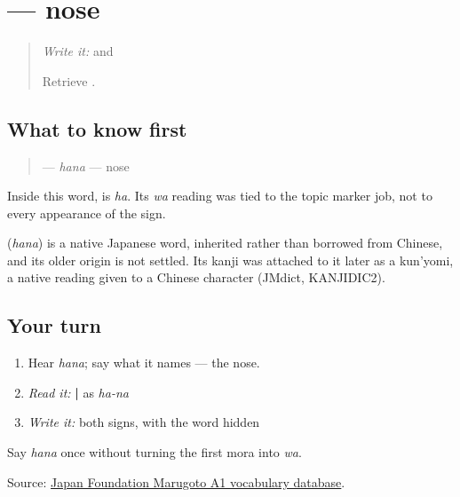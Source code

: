 \section[\texorpdfstring{\ja{はな} (hana)}{はな (hana)}]{ — nose}

\label{lesson:JA-C11-hana}



\begin{quote}
\emph{Write it:} \textbf{} and \textbf{}

Retrieve \textbf{}.
\end{quote}

\subsection*{What to know first}
\begin{quote}
\textbf{} — \emph{hana} — nose
\end{quote}

Inside this word, \textbf{} is \emph{ha}. Its \emph{wa} reading was tied to the topic marker job, not to every appearance of the sign.

\begin{cousinweb}
\textbf{} (\emph{hana}) is a native Japanese word, inherited rather than borrowed from Chinese, and its older origin is not settled. Its kanji was attached to it later as a kun'yomi, a native reading given to a Chinese character (JMdict, KANJIDIC2).
\end{cousinweb}

\subsection*{Your turn}
\begin{enumerate}
\raggedright
  \item Hear \emph{hana}; say what it names — the nose.
  \item \emph{Read it:} \textbf{ | } as \emph{ha-na}
  \item \emph{Write it:} both signs, with the word hidden
\end{enumerate}

\begin{tcolorbox}[breakable,colback=teal!4,colframe=teal!35!black,title={Before you move on}]
Say \emph{hana} once without turning the first mora into \emph{wa}.

Source: \href{https://words.marugotoweb.jp/}{Japan Foundation Marugoto A1 vocabulary database}.
\end{tcolorbox}
